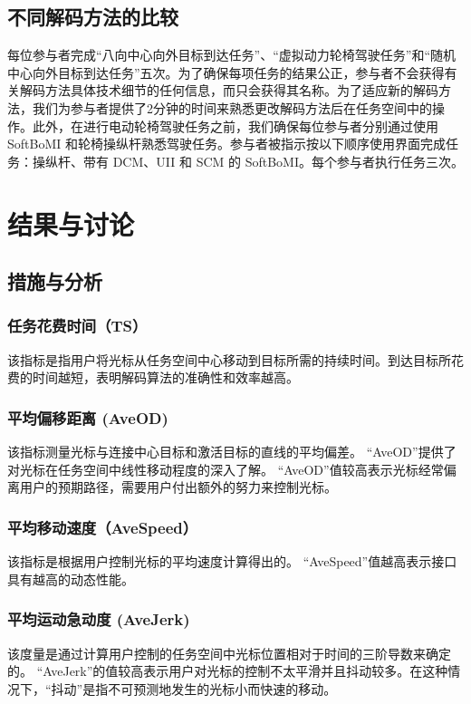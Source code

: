 \subsection{不同解码方法的比较  }    每位参与者完成“八向中心向外目标到达任务”、“虚拟动力轮椅驾驶任务”和“随机中心向外目标到达任务”五次。为了确保每项任务的结果公正，参与者不会获得有关解码方法具体技术细节的任何信息，而只会获得其名称。为了适应新的解码方法，我们为参与者提供了2分钟的时间来熟悉更改解码方法后在任务空间中的操作。此外，在进行电动轮椅驾驶任务之前，我们确保每位参与者分别通过使用 SoftBoMI 和轮椅操纵杆熟悉驾驶任务。参与者被指示按以下顺序使用界面完成任务：操纵杆、带有 DCM、UII 和 SCM 的 SoftBoMI。每个参与者执行任务三次。  

\section{结果与讨论  }     

\subsection{措施与分析  }   
 \subsubsection{任务花费时间（TS）  }    该指标是指用户将光标从任务空间中心移动到目标所需的持续时间。到达目标所花费的时间越短，表明解码算法的准确性和效率越高。
 \subsubsection{平均偏移距离 (AveOD)  }    该指标测量光标与连接中心目标和激活目标的直线的平均偏差。 “AveOD”提供了对光标在任务空间中线性移动程度的深入了解。 “AveOD”值较高表示光标经常偏离用户的预期路径，需要用户付出额外的努力来控制光标。
 \subsubsection{平均移动速度（AveSpeed）  }    该指标是根据用户控制光标的平均速度计算得出的。 “AveSpeed”值越高表示接口具有越高的动态性能。
 \subsubsection{平均运动急动度 (AveJerk)  }    该度量是通过计算用户控制的任务空间中光标位置相对于时间的三阶导数来确定的。 “AveJerk”的值较高表示用户对光标的控制不太平滑并且抖动较多。在这种情况下，“抖动”是指不可预测地发生的光标小而快速的移动。  

